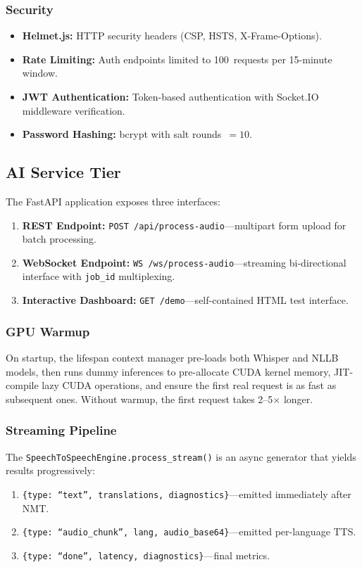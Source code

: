 \documentclass[conference]{IEEEtran}
\begin{document}
\subsubsection{Security}
\begin{itemize}
  \item \textbf{Helmet.js:} HTTP security headers (CSP, HSTS, X-Frame-Options).
  \item \textbf{Rate Limiting:} Auth endpoints limited to 100~requests per 15-minute window.
  \item \textbf{JWT Authentication:} Token-based authentication with Socket.IO middleware verification.
  \item \textbf{Password Hashing:} bcrypt with salt rounds~$= 10$.
\end{itemize}

\subsection{AI Service Tier}

The FastAPI application exposes three interfaces:
\begin{enumerate}
  \item \textbf{REST Endpoint:} \texttt{POST /api/process-audio}---multipart form upload for batch processing.
  \item \textbf{WebSocket Endpoint:} \texttt{WS /ws/process-audio}---streaming bi-directional interface with \texttt{job\_id} multiplexing.
  \item \textbf{Interactive Dashboard:} \texttt{GET /demo}---self-contained HTML test interface.
\end{enumerate}

\subsubsection{GPU Warmup}

On startup, the lifespan context manager pre-loads both Whisper and NLLB models, then runs dummy inferences to pre-allocate CUDA kernel memory, JIT-compile lazy CUDA operations, and ensure the first real request is as fast as subsequent ones. Without warmup, the first request takes 2--5$\times$ longer.

\subsubsection{Streaming Pipeline}

The \texttt{SpeechToSpeechEngine.process\_stream()} is an async generator that yields results progressively:
\begin{enumerate}
  \item \texttt{\{type: ``text'', translations, diagnostics\}}---emitted immediately after NMT.
  \item \texttt{\{type: ``audio\_chunk'', lang, audio\_base64\}}---emitted per-language TTS.
  \item \texttt{\{type: ``done'', latency, diagnostics\}}---final metrics.
\end{enumerate}
\end{document}
